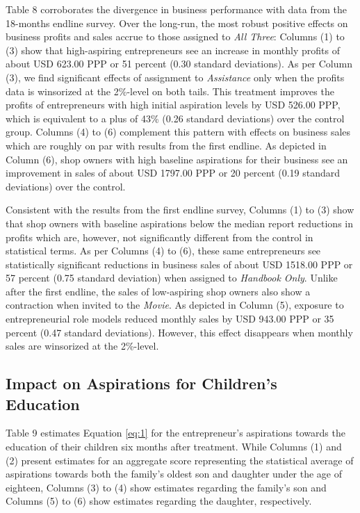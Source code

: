 \documentclass[11.5pt]{article}
\begin{document}
Table 8 corroborates the divergence in business performance with data from the 18-months endline survey. Over the long-run, the most robust positive effects on business profits and sales accrue to those assigned to \emph{All Three}: Columns (1) to (3) show that high-aspiring entrepreneurs see an increase in monthly profits of about USD 623.00 PPP or 51 percent (0.30 standard deviations). As per Column (3), we find significant effects of assignment to \emph{Assistance} only when the profits data is winsorized at the 2\%-level on both tails. This treatment improves the profits of entrepreneurs with high initial aspiration levels by USD 526.00 PPP, which is equivalent to a plus of 43\% (0.26 standard deviations) over the control group. Columns (4) to (6) complement this pattern with effects on business sales which are roughly on par with results from the first endline. As depicted in Column (6), shop owners with high baseline aspirations for their business see an improvement in sales of about USD 1797.00 PPP or 20 percent (0.19 standard deviations) over the control.

Consistent with the results from the first endline survey, Columns (1) to (3) show that shop owners with baseline aspirations below the median report reductions in profits which are, however, not significantly different from the control in statistical terms. As per Columns (4) to (6), these same entrepreneurs see statistically significant reductions in business sales of about USD 1518.00 PPP or 57 percent (0.75 standard deviation) when assigned to \emph{Handbook Only}. %
Unlike after the first endline, the sales of low-aspiring shop owners also show a contraction when invited to the \emph{Movie}. As depicted in Column (5), exposure to entrepreneurial role models reduced monthly sales by USD 943.00 PPP or 35 percent (0.47 standard deviations). However, this effect disappears when monthly sales are winsorized at the 2\%-level. %

\subsection{Impact on Aspirations for Children's Education}

Table 9 estimates Equation \eqref{eq:1} for the entrepreneur's aspirations towards the education of their children six months after treatment. While Columns (1) and (2) present estimates for an aggregate score representing the statistical average of aspirations towards both the family's oldest son and daughter under the age of eighteen, Columns (3) to (4) show estimates regarding the family's son and Columns (5) to (6) show estimates regarding the daughter, respectively.
\end{document}
